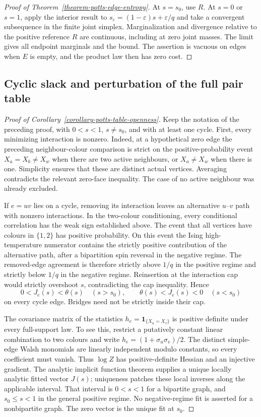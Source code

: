 \documentclass[a4paper,11pt,reqno]{amsart}
\theoremstyle{plain}
\theoremstyle{definition}
\theoremstyle{remark}
\begin{document}
\begin{proof}[Proof of Theorem~\ref{theorem-potts-edge-entropy}]
At $s=s_0$, use $R$.  At $s=0$ or $s=1$, apply the interior result to
$s_\varepsilon=(1-\varepsilon)s+\varepsilon/q$ and take a convergent
subsequence in the finite joint simplex.  Marginalization and divergence
relative to the positive reference $R$ are continuous, including at zero
joint masses.  The limit gives all endpoint marginals and the bound.
The assertion is vacuous on edges when $E$ is empty, and the product law
then has zero cost.
\end{proof}

\subsection{Cyclic slack and perturbation of the full pair table}

\begin{proof}[Proof of Corollary~\ref{corollary-potts-table-openness}]
Keep the notation of the preceding proof, with $0<s<1$, $s\ne s_0$, and
with at least one cycle.  First, every minimizing interaction is nonzero.
Indeed, at a hypothetical zero edge the preceding neighbour-colour
comparison is strict on the positive-probability event
$X_a=X_b\ne X_w$ when there are two active neighbours, or $X_a\ne X_w$
when there is one.  Simplicity ensures that these are distinct actual
vertices.  Averaging contradicts the relevant zero-face inequality.
The case of no active neighbour was already excluded.

If $e=uv$ lies on a cycle, removing its interaction leaves an alternative
$u$--$v$ path with nonzero interactions.  In the two-colour conditioning,
every conditional correlation has the weak sign established above.
The event that all vertices have colours in $\{1,2\}$ has positive
probability.  On this event the Ising high-temperature numerator contains
the strictly positive contribution of the alternative path, after a
bipartition spin reversal in the negative regime.  The removed-edge
agreement is therefore strictly above $1/q$ in the positive regime and
strictly below $1/q$ in the negative regime.  Reinsertion at the interaction
cap would strictly overshoot $s$, contradicting the cap inequality.  Hence
\[
 0<J_e(s)<\theta(s)\quad(s>s_0),\qquad
 \theta(s)<J_e(s)<0\quad(s<s_0)
\]
on every cycle edge.  Bridges need not be strictly inside their cap.

The covariance matrix of the statistics
$h_e=\mathbf1_{\{X_u=X_v\}}$ is positive definite under every full-support
law.  To see this, restrict a putatively constant linear combination to
two colours and write $h_e=(1+\sigma_u\sigma_v)/2$.  The distinct
simple-edge Walsh monomials are linearly independent modulo constants,
so every coefficient must vanish.  Thus $\log Z$ has positive-definite
Hessian and an injective gradient.  The analytic implicit function theorem
supplies a unique locally analytic fitted vector $J(s)$; uniqueness patches
these local inverses along the applicable interval.  That interval is
$0<s<1$ for a bipartite graph, and $s_0\le s<1$ in the general positive
regime.  No negative-regime fit is asserted for a nonbipartite graph.
The zero vector is the unique fit at $s_0$.


\end{proof}
\end{document}
